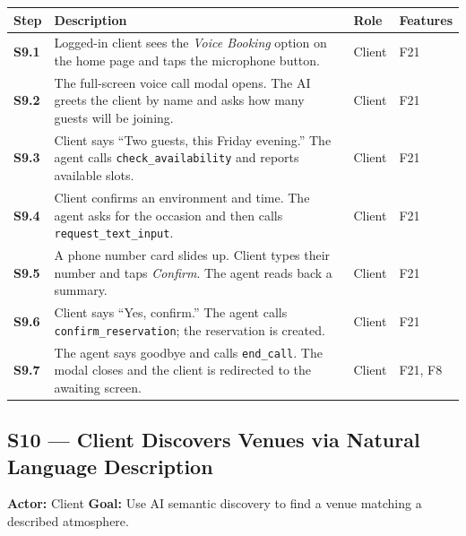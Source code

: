 \documentclass[12pt,a4paper,oneside]{report}
\begin{document}
\begin{longtable}{>{\bfseries}l L{6.2cm} l L{2.8cm}}
  \toprule
  Step & Description & Role & Features \\
  \midrule
  S9.1 & Logged-in client sees the \emph{Voice Booking} option on the home page
         and taps the microphone button. & Client & F21 \\
  S9.2 & The full-screen voice call modal opens. The AI greets the client by
         name and asks how many guests will be joining. & Client & F21 \\
  S9.3 & Client says ``Two guests, this Friday evening.'' The agent calls
         \texttt{check\_availability} and reports available slots. & Client & F21 \\
  S9.4 & Client confirms an environment and time. The agent asks for the
         occasion and then calls \texttt{request\_text\_input}. & Client & F21 \\
  S9.5 & A phone number card slides up. Client types their number and taps
         \emph{Confirm}. The agent reads back a summary. & Client & F21 \\
  S9.6 & Client says ``Yes, confirm.'' The agent calls
         \texttt{confirm\_reservation}; the reservation is created. & Client & F21 \\
  S9.7 & The agent says goodbye and calls \texttt{end\_call}. The modal closes
         and the client is redirected to the awaiting screen. & Client & F21, F8 \\
  \bottomrule
\end{longtable}

\subsection*{S10 --- Client Discovers Venues via Natural Language Description}
\begin{mdframed}[style=scenariobox]
\textbf{Actor:} Client \quad
\textbf{Goal:} Use AI semantic discovery to find a venue matching a described
atmosphere.
\end{mdframed}
\end{document}
